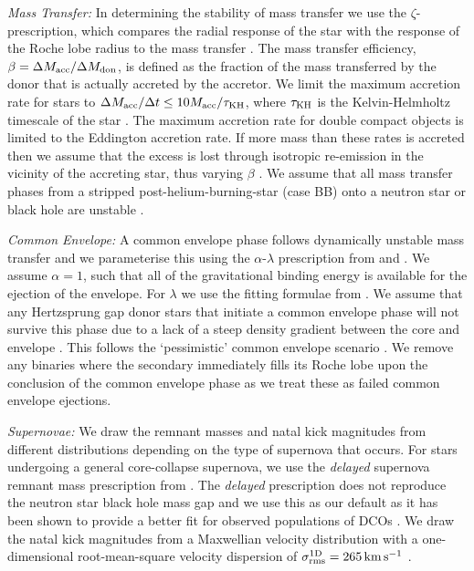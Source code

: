 \textit{Mass Transfer:} In determining the stability of mass transfer we use the $\zeta$-prescription, which compares the radial response of the star with the response of the Roche lobe radius to the mass transfer \citep[e.g.][]{Hjellming+1987}. The mass transfer efficiency, $\beta = \Delta M_{\rm acc} / \Delta M_{\rm don}$, is defined as the fraction of the mass transferred by the donor that is actually accreted by the accretor. We limit the maximum accretion rate for stars to $\Delta M_{\rm acc} / \Delta t \le 10 M_{\rm acc} / \tau_{\rm KH}$, where $\tau_{\rm KH}$ is the Kelvin-Helmholtz timescale of the star \citep{Paczynski+1972, Hurley+2002}. The maximum accretion rate for double compact objects is limited to the Eddington accretion rate. If more mass than these rates is accreted then we assume that the excess is lost through isotropic re-emission in the vicinity of the accreting star, thus varying $\beta$ \citep[e.g.][]{Massevitch+1975, Soberman+1997}. We assume that all mass transfer phases from a stripped post-helium-burning-star (case BB) onto a neutron star or black hole are unstable \citep{Tauris+2015}.

\textit{Common Envelope:} A common envelope phase follows dynamically unstable mass transfer and we parameterise this using the $\alpha$-$\lambda$ prescription from \citet{Webbink+1984} and \citet{deKool+1990}. We assume $\alpha = 1$, such that all of the gravitational binding energy is available for the ejection of the envelope. For $\lambda$ we use the fitting formulae from \citet{Xu+2010, Xu+2010a}. We assume that any Hertzsprung gap donor stars that initiate a common envelope phase will not survive this phase due to a lack of a steep density gradient between the core and envelope \citep{Taam+2000, Ivanova+2004}. This follows the `pessimistic' common envelope scenario \citep[c.f.][]{Belczynski+2007}. We remove any binaries where the secondary immediately fills its Roche lobe upon the conclusion of the common envelope phase as we treat these as failed common envelope ejections.

\textit{Supernovae:} We draw the remnant masses and natal kick magnitudes from different distributions depending on the type of supernova that occurs. For stars undergoing a general core-collapse supernova, we use the \textit{delayed} supernova remnant mass prescription from \citet{Fryer+2012}. The \textit{delayed} prescription does not reproduce the neutron star black hole mass gap and we use this as our default as it has been shown to provide a better fit for observed populations of DCOs \citep[e.g.][]{Vigna-Gomez+2018}. We draw the natal kick magnitudes from a Maxwellian velocity distribution with a one-dimensional root-mean-square velocity dispersion of $\sigma_{\rm rms}^{\rm 1D} = 265 \unit{km}{s^{-1}}$ \citep{Lyne+1994, Hobbs+2005}.

